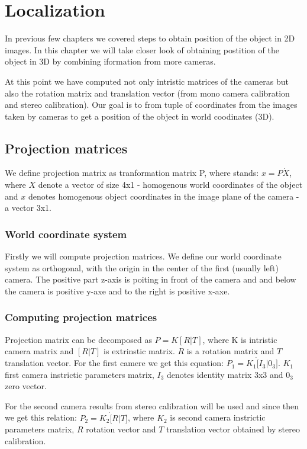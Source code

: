 \chapter{Localization}

In previous few chapters we covered steps to obtain position of the object in
2D images. In this chapter we will take closer look of obtaining postition of
the object in 3D by combining iformation from more cameras.

At this point we have computed not only intristic matrices of the cameras but
also the rotation matrix and translation vector (from mono camera calibration
and stereo calibration). Our goal is to from tuple of coordinates from the
images taken by cameras to get a position of the object in world coodinates
(3D).

\section{Projection matrices}
We define projection matrix as tranformation matrix P, where stands: $x = P
\dot X$, where $X$ denote a vector of size 4x1 - homogenous world coordinates
of the object and $x$ denotes homogenous object coordinates in the image plane
of the camera - a vector 3x1.

\subsection{World coordinate system}
Firstly we will compute projection matrices. We define our world coordinate
system as orthogonal, with the origin in the center of the first (usually left)
camera. The positive part z-axis is poiting in front of the camera and and
below the camera is positive y-axe and to the right is positive x-axe.

\subsection{Computing projection matrices}
Projection matrix can be decomposed as $P = K[R|T]$, where K is intristic
camera matrix and $[R|T]$ is extrinstic matrix. $R$ is a rotation matrix and
$T$ translation vector. For the first camere we get this equation: $ P_1 = K_1
\dot [I_3 | 0_3]$. $K_1$ first camera instrictic parameters matrix, $I_3$
denotes identity matrix 3x3 and $0_3$ zero vector.

For the second camera results from stereo calibration will be used and since
then we get this relation: $P_2 = K_2 \dot [R | T]$, where $K_2$ is second
camera instrictic parameters matrix, $R$ rotation vector and $T$ translation
vector obtained by stereo calibration.


